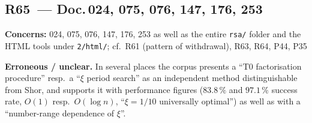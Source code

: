 \medskip

\subsection*{R65~--- Doc.\,024, 075, 076, 147, 176, 253}

\noindent\textbf{Concerns:} 024, 075, 076, 147, 176, 253 as well as the
entire \texttt{rsa/} folder and the HTML tools under \texttt{2/html/};
cf.\ R61 (pattern of withdrawal), R63, R64, P44, P35

\smallskip\noindent\textbf{Erroneous / unclear.}\quad
In several places the corpus presents a \enquote{T0 factorisation
procedure} resp.\ a \enquote{$\xi$ period search} as an independent
method distinguishable from Shor, and supports it with performance
figures ($83.8\,\%$ and $97.1\,\%$ success rate, $O(1)$ resp.\
$O(\log n)$, \enquote{$\xi = 1/10$ universally optimal}) as well as with
a \enquote{number-range dependence of $\xi$}.

